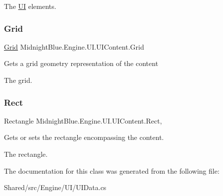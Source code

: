 The \hyperlink{namespace_midnight_blue_1_1_engine_1_1_u_i}{UI} elements.\hypertarget{class_midnight_blue_1_1_engine_1_1_u_i_1_1_u_i_content_ada50c4f103ff9317b361dc990834fc2c}{}\label{class_midnight_blue_1_1_engine_1_1_u_i_1_1_u_i_content_ada50c4f103ff9317b361dc990834fc2c} 
\subsubsection{\texorpdfstring{Grid}{Grid}}
{\footnotesize\ttfamily \hyperlink{class_midnight_blue_1_1_engine_1_1_geometry_1_1_grid}{Grid} Midnight\+Blue.\+Engine.\+U\+I.\+U\+I\+Content.\+Grid\hspace{0.3cm}{\ttfamily [get]}}



Gets a grid geometry representation of the content 

The grid.\hypertarget{class_midnight_blue_1_1_engine_1_1_u_i_1_1_u_i_content_ab91bd11a4e18b9a9716b4e71a9a3508e}{}\label{class_midnight_blue_1_1_engine_1_1_u_i_1_1_u_i_content_ab91bd11a4e18b9a9716b4e71a9a3508e} 
\subsubsection{\texorpdfstring{Rect}{Rect}}
{\footnotesize\ttfamily Rectangle Midnight\+Blue.\+Engine.\+U\+I.\+U\+I\+Content.\+Rect\hspace{0.3cm}{\ttfamily [get]}, {\ttfamily [set]}}



Gets or sets the rectangle encompassing the content. 

The rectangle.

The documentation for this class was generated from the following file\+:\begin{DoxyCompactItemize}
\item 
Shared/src/\+Engine/\+U\+I/U\+I\+Data.\+cs\end{DoxyCompactItemize}
